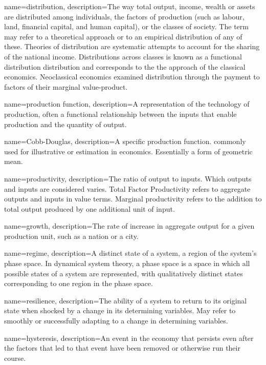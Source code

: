{
name=distribution,
description={The way total output, income, wealth or assets are distributed among individuals, the factors of production (such as labour, land, financial capital,  and human capital), or the classes of society. The term may refer to a theoretical approach  or to an empirical distribution of any of these. Theories of distribution are systematic attempts to account for the sharing of the national income.  Distributions across classes is known as a functional distribution distribution and  corresponds to the the approach of the \gls{classical economics}. Neoclassical economics examined distribution through the payment to factors of their \gls{marginal value-product}.}
}

{
name=production function,
description={A representation of the technology of production, often a functional relationship between the inputs that enable production and the quantity of output.}
}

{
name=Cobb-Douglas,
description={A specific production function. commonly used for illustrative or estimation in economics. Essentially a form of geometric mean.}
}

{
name=productivity,
description={The ratio of output to inputs. Which outputs and inputs are considered varies. Total Factor Productivity refers to aggregate outputs and inputs in value terms. Marginal productivity refers to the addition to total output produced by one additional unit of input.} 
}

{
name=growth,
description={The rate of increase in aggregate output for a given production unit, such as a nation  or a city.}
}

{
name=regime,
description={A distinct state of a system, a region of the system's phase space. In dynamical system theory, a phase space is a space in which all possible states of a system are represented, with qualitatively distinct  states corresponding to one region in the phase space.}
}

{
name=resilience,
description={The ability of a system to return to its original state when shocked by a change in its determining variables. May refer to smoothly or successfully adapting to a change in  determining variables.}
}

{
name=hysteresis,
description={An event in the economy that persists even after the factors that led to that event have been removed or otherwise run their course.}
}

